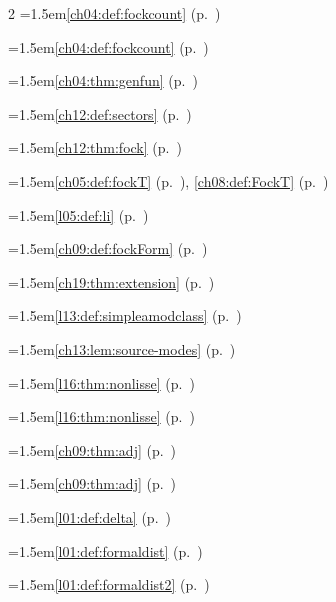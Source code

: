 \begin{multicols}{2}
\hangindent=1.5em\quad \ref{ch04:def:fockcount} (p.~\pageref{ch04:def:fockcount})\par
\hangindent=1.5em\quad \ref{ch04:def:fockcount} (p.~\pageref{ch04:def:fockcount})\par
\hangindent=1.5em\quad \ref{ch04:thm:genfun} (p.~\pageref{ch04:thm:genfun})\par
\hangindent=1.5em\quad \ref{ch12:def:sectors} (p.~\pageref{ch12:def:sectors})\par
\hangindent=1.5em\quad \ref{ch12:thm:fock} (p.~\pageref{ch12:thm:fock})\par
\hangindent=1.5em\quad \ref{ch05:def:fockT} (p.~\pageref{ch05:def:fockT}), \ref{ch08:def:FockT} (p.~\pageref{ch08:def:FockT})\par
\hangindent=1.5em\quad \ref{l05:def:li} (p.~\pageref{l05:def:li})\par
\hangindent=1.5em\quad \ref{ch09:def:fockForm} (p.~\pageref{ch09:def:fockForm})\par
\hangindent=1.5em\quad \ref{ch19:thm:extension} (p.~\pageref{ch19:thm:extension})\par
\hangindent=1.5em\quad \ref{l13:def:simpleamodclass} (p.~\pageref{l13:def:simpleamodclass})\par
\hangindent=1.5em\quad \ref{ch13:lem:source-modes} (p.~\pageref{ch13:lem:source-modes})\par
\hangindent=1.5em\quad \ref{l16:thm:nonlisse} (p.~\pageref{l16:thm:nonlisse})\par
\hangindent=1.5em\quad \ref{l16:thm:nonlisse} (p.~\pageref{l16:thm:nonlisse})\par
\hangindent=1.5em\quad \ref{ch09:thm:adj} (p.~\pageref{ch09:thm:adj})\par
\hangindent=1.5em\quad \ref{ch09:thm:adj} (p.~\pageref{ch09:thm:adj})\par
\hangindent=1.5em\quad \ref{l01:def:delta} (p.~\pageref{l01:def:delta})\par
\hangindent=1.5em\quad \ref{l01:def:formaldist} (p.~\pageref{l01:def:formaldist})\par
\hangindent=1.5em\quad \ref{l01:def:formaldist2} (p.~\pageref{l01:def:formaldist2})\par

\end{multicols}
